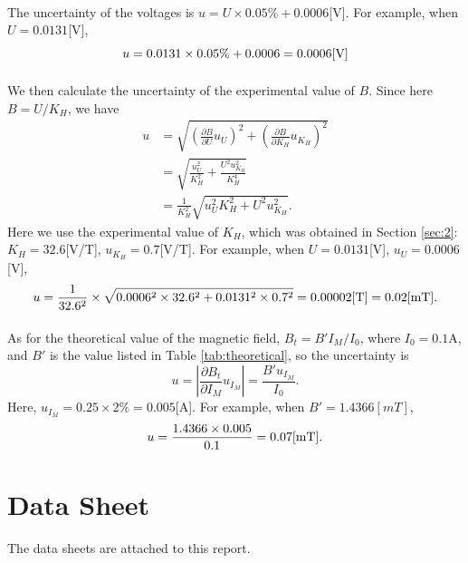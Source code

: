 \documentclass[a4paper]{article}
\begin{document}
    \paragraph{} The uncertainty of the voltages is $u=U\times 0.05\% +0.0006$[V]. For example, when $U=0.0131$[V], $$u=0.0131\times 0.05\%+0.0006=0.0006[\rm V]$$  
    \paragraph{} We then calculate the uncertainty of the experimental value of $B$. Since here $B=U/K_H$, we have \begin{equation*}
        \begin{split}
            u&=\sqrt{\left(\frac{\partial B}{\partial U}u_U\right)^2+\left(\frac{\partial B}{\partial K_H}u_{K_H}\right)^2}\\
            &=\sqrt{\frac{u_U^2}{K_H^2}+\frac{U^2u_{K_H}^2}{K_H^4}}\\
            &=\frac{1}{K_H^2}\sqrt{u_U^2K_H^2+U^2u_{K_H}^2}.
        \end{split}
    \end{equation*}
    Here we use the experimental value of $K_H$, which was obtained in Section \ref{sec:2}: $K_H=32.6$[V/T], $u_{K_H}=0.7$[V/T]. For example, when $U=0.0131$[V], $u_U=0.0006$[V],$$u=\frac{1}{32.6^2}\times \sqrt{0.0006^2\times 32.6^2+0.0131^2\times 0.7^2}=0.00002[\rm T]=0.02[mT].$$
    \paragraph{} As for the theoretical value of the magnetic field, $B_t=B'I_M/I_0$, where $I_0=0.1$A, and $B'$ is the value listed in Table \ref{tab:theoretical}, so the uncertainty is $$u=\left|\frac{\partial B_t}{\partial I_M}u_{I_M}\right|=\frac{B'u_{I_M}}{I_0}.$$ Here, $u_{I_M}=0.25\times 2\%=0.005$[A]. For example, when $B'=1.4366[mT]$, $$u=\frac{1.4366\times 0.005}{0.1}=0.07[\rm mT].$$
    \section{Data Sheet}
    \paragraph{} The data sheets are attached to this report.
\end{document}
